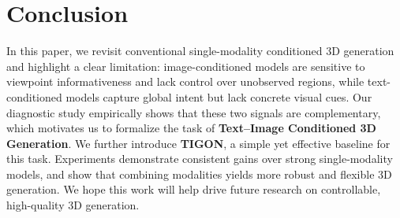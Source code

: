 \section{Conclusion}
\label{sec:conclusion}
In this paper, we revisit conventional single-modality conditioned 3D generation and highlight a clear limitation: image-conditioned models are sensitive to viewpoint informativeness and lack control over unobserved regions, while text-conditioned models capture global intent but lack concrete visual cues. Our diagnostic study empirically shows that these two signals are complementary, which motivates us to formalize the task of \textbf{Text--Image Conditioned 3D Generation}. We further introduce \textbf{TIGON}, a simple yet effective baseline for this task. Experiments demonstrate consistent gains over strong single-modality models, and show that combining modalities yields more robust and flexible 3D generation. We hope this work will help drive future research on controllable, high-quality 3D generation.



